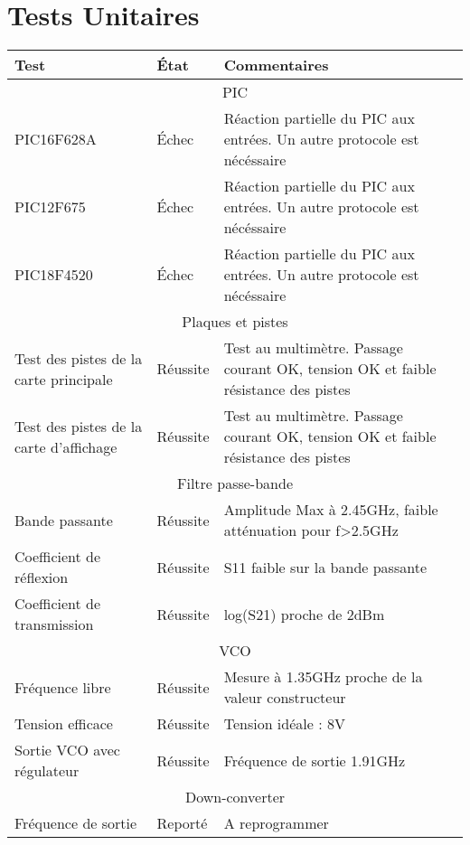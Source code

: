 \chapter{Tests Unitaires}


\begin{tabular}{|p{}  |m{}  |p{} |}	
\hline
Test & État & Commentaires \\ \hline
\multicolumn{3}{|c|}{PIC}\\ \hline
PIC16F628A & Échec & Réaction partielle du PIC aux entrées. Un autre protocole est nécéssaire \\ \hline
PIC12F675 & Échec & Réaction partielle du PIC aux entrées. Un autre protocole est nécéssaire \\ \hline
PIC18F4520 & Échec & Réaction partielle du PIC aux entrées. Un autre protocole est nécéssaire \\ 
\hline
\multicolumn{3}{|c|}{Plaques et pistes}\\ 
\hline
Test des pistes de la carte principale & Réussite & Test au multimètre. Passage courant OK, tension OK et faible résistance des pistes \\ 
\hline
Test des pistes de la carte d'affichage & Réussite & Test au multimètre. Passage courant OK, tension OK et faible résistance des pistes \\
\hline
\multicolumn{3}{|c|}{Filtre passe-bande}\\ 
\hline
Bande passante & Réussite & Amplitude Max à 2.45GHz, faible atténuation pour f>2.5GHz \\
\hline
Coefficient de réflexion & Réussite & S11 faible sur la bande passante \\
\hline
Coefficient de transmission & Réussite & log(S21) proche de 2dBm \\
\hline
\multicolumn{3}{|c|}{VCO}\\ \hline
Fréquence libre & Réussite & Mesure à 1.35GHz proche de la valeur constructeur \\ 
\hline
Tension efficace & Réussite & Tension idéale : 8V \\
\hline
Sortie VCO avec régulateur & Réussite & Fréquence de sortie 1.91GHz \\
\hline
\multicolumn{3}{|c|}{Down-converter}\\ \hline
Fréquence de sortie & Reporté & A reprogrammer \\
\hline
\end{tabular}

